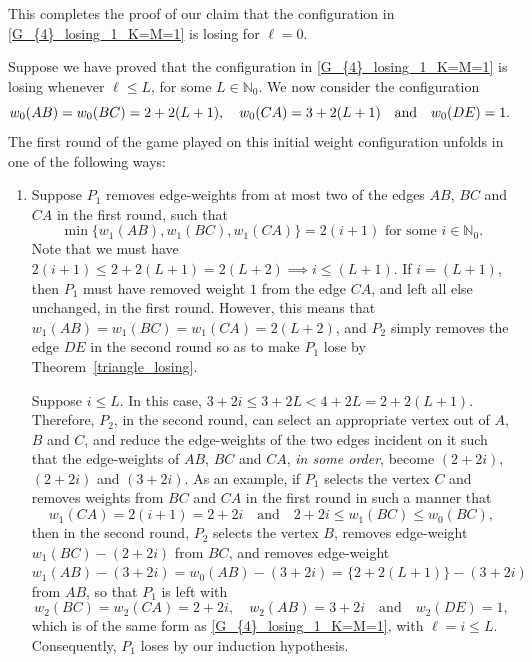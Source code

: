 \documentclass[11pt,reqno]{amsart}
\theoremstyle{definition}
\theoremstyle{definition}
\begin{document}
This completes the proof of our claim that the configuration in \eqref{G_{4}_losing_1_K=M=1} is losing for $\ell=0$.

Suppose we have proved that the configuration in \eqref{G_{4}_losing_1_K=M=1} is losing whenever $\ell \leqslant L$, for some $L \in \mathbb{N}_{0}$. We now consider the configuration
\begin{equation}
w_{0}(AB)=w_{0}(BC)=2+2(L+1),\quad w_{0}(CA)=3+2(L+1) \quad \text{and} \quad w_{0}(DE)=1.\label{G_{4}_losing_1_K=M=1_inductive}
\end{equation}
The first round of the game played on this initial weight configuration unfolds in one of the following ways:
\begin{enumerate}
\item Suppose $P_{1}$ removes edge-weights from at most two of the edges $AB$, $BC$ and $CA$ in the first round, such that 
\begin{equation}
\min\{w_{1}(AB),w_{1}(BC),w_{1}(CA)\}=2(i+1) \text{ for some } i \in \mathbb{N}_{0}.\nonumber
\end{equation}
Note that we must have $2(i+1) \leqslant 2+2(L+1)=2(L+2) \implies i \leqslant (L+1)$. If $i=(L+1)$, then $P_{1}$ must have removed weight $1$ from the edge $CA$, and left all else unchanged, in the first round. However, this means that $w_{1}(AB)=w_{1}(BC)=w_{1}(CA)=2(L+2)$, and $P_{2}$ simply removes the edge $DE$ in the second round so as to make $P_{1}$ lose by Theorem~\ref{triangle_losing}.

Suppose $i \leqslant L$. In this case, $3+2i\leqslant 3+2L < 4+2L=2+2(L+1)$. Therefore, $P_{2}$, in the second round, can select an appropriate vertex out of $A$, $B$ and $C$, and reduce the edge-weights of the two edges incident on it such that the edge-weights of $AB$, $BC$ and $CA$, \emph{in some order}, become $(2+2i)$, $(2+2i)$ and $(3+2i)$. As an example, if $P_{1}$ selects the vertex $C$ and removes weights from $BC$ and $CA$ in the first round in such a manner that 
\begin{equation}
w_{1}(CA)=2(i+1)=2+2i \quad \text{and} \quad 2+2i \leqslant w_{1}(BC) \leqslant w_{0}(BC),\nonumber
\end{equation} 
then in the second round, $P_{2}$ selects the vertex $B$, removes edge-weight $w_{1}(BC)-(2+2i)$ from $BC$, and removes edge-weight $w_{1}(AB)-(3+2i)=w_{0}(AB)-(3+2i)=\{2+2(L+1)\}-(3+2i)$ from $AB$, so that $P_{1}$ is left with
\begin{equation}
w_{2}(BC)=w_{2}(CA)=2+2i, \quad w_{2}(AB)=3+2i \quad \text{and} \quad w_{2}(DE)=1,\nonumber
\end{equation}
which is of the same form as \eqref{G_{4}_losing_1_K=M=1}, with $\ell=i \leqslant L$. Consequently, $P_{1}$ loses by our induction hypothesis. 


\end{enumerate}
\end{document}
